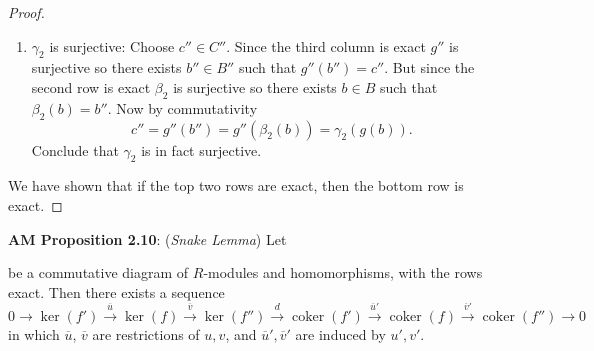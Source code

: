 \documentclass[8pt]{amsart}
\theoremstyle{plain}%
\theoremstyle{definition}
\theoremstyle{remark}
\numberwithin{equation}{section}
\newcommand{\coker}{\operatorname{coker}}
\begin{document}
\begin{proof}
\begin{enumerate}
			\item $\gamma_2$ is surjective: Choose $c'' \in C''$. Since the third column is exact $g''$ is surjective so there exists $b'' \in B''$ such that $g''(b'') = c''$. But since the second row is exact $\beta_2$ is surjective so there exists $b \in B$ such that $\beta_2(b) = b''$. Now by commutativity $$c'' = g''(b'') = g''(\beta_2(b)) = \gamma_2(g(b)).$$ Conclude that $\gamma_2$ is in fact surjective.
		\end{enumerate}
		We have shown that if the top two rows are exact, then the bottom row is exact.
	\end{proof}


\textbf{AM Proposition 2.10}: (\textit{Snake Lemma}) Let

	\begin{center}
	\end{center}

be a commutative diagram of $R$-modules and homomorphisms, with the rows exact. Then there exists a sequence $$0 \rightarrow \ker(f') \xrightarrow{\overline u} \ker(f) \xrightarrow{\overline v} \ker (f'') \xrightarrow d \coker(f') \xrightarrow {\overline u'} \coker (f) \xrightarrow{\overline v'} \coker(f'') \rightarrow 0$$ in which $\overline u$, $\overline v$ are restrictions of $u, v$, and $\overline u', \overline v'$ are induced by $u', v'$.\\
\end{document}
